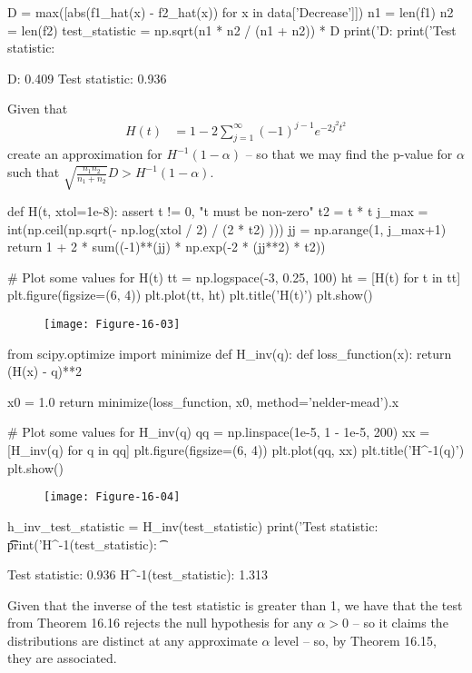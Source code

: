 \begin{python}
D = max([abs(f1_hat(x) - f2_hat(x)) for x in data['Decrease']])
n1 = len(f1)
n2 = len(f2)
test_statistic = np.sqrt(n1 * n2 / (n1 + n2)) * D
print('D: %
print('Test statistic: %
\end{python}
\begin{console}
D: 0.409
Test statistic: 0.936
\end{console}
Given that
\begin{align*}
H(t) &= 1 - 2 \sum_{j=1}^{\infty} (-1)^{j-1} e^{-2j^{2}t^{2}}
\end{align*}
 create an approximation for \(H^{-1}(1 - \alpha)\) -- so that we
may find the p-value for \(\alpha\) such that $
\sqrt{\frac{n_{1} n_{2}}{n_{1} + n_{2}}} D > H^{-1}(1 -
\alpha) $.

\begin{python}
def H(t, xtol=1e-8):
    assert t != 0, "t must be non-zero"
    t2 = t * t
    j_max = int(np.ceil(np.sqrt(- np.log(xtol / 2) / (2 * t2) )))
    jj = np.arange(1, j_max+1)
    return 1 + 2 * sum((-1)**(jj) * np.exp(-2 * (jj**2) * t2))
\end{python}

\begin{python}
# Plot some values for H(t)
tt = np.logspace(-3, 0.25, 100)
ht = [H(t) for t in tt]
plt.figure(figsize=(6, 4))
plt.plot(tt, ht)
plt.title('H(t)')
plt.show()
\end{python}

\begin{figure}[H]
\centering
\texttt{[image: Figure-16-03]}
\end{figure}


\begin{python}
from scipy.optimize import minimize
def H_inv(q):
    def loss_function(x):
        return (H(x) - q)**2
    
    x0 = 1.0
    return minimize(loss_function, x0, method='nelder-mead').x
\end{python}

\begin{python}
# Plot some values for H_inv(q)
qq = np.linspace(1e-5, 1 - 1e-5, 200)
xx = [H_inv(q) for q in qq]
plt.figure(figsize=(6, 4))
plt.plot(qq, xx)
plt.title('H^{-1}(q)')
plt.show()
\end{python}

\begin{figure}[H]
\centering
\texttt{[image: Figure-16-04]}
\end{figure}


\begin{python}
h_inv_test_statistic = H_inv(test_statistic)
print('Test statistic: \t\t%
print('H^{-1}(test_statistic): \t%
\end{python}
\begin{console}
Test statistic:                 0.936
H^{-1}(test\_statistic):         1.313
\end{console}
Given that the inverse of the test statistic is greater than 1, we have
that the test from Theorem 16.16 rejects the null hypothesis for any
\(\alpha > 0\) -- so it claims the distributions are distinct at any
approximate \(\alpha\) level -- so, by Theorem 16.15, they are
associated.
